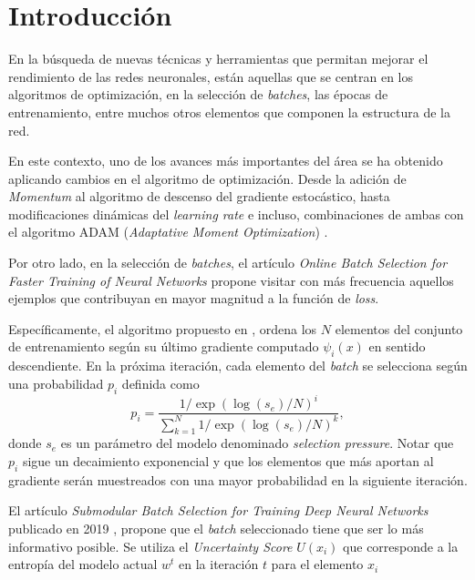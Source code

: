 \section{Introducción}

En la búsqueda de nuevas técnicas y herramientas que permitan mejorar el rendimiento de las redes neuronales, están aquellas que se centran en los algoritmos de optimización, en la selección de \textit{batches}, las épocas de entrenamiento, entre muchos otros elementos que componen la estructura de la red. 

\vspace{0.2cm}

En este contexto, uno de los avances más importantes del área se ha obtenido aplicando cambios en el algoritmo de optimización. Desde la adición de \textit{Momentum} al algoritmo de descenso del gradiente estocástico, hasta modificaciones dinámicas del \textit{learning rate} e incluso, combinaciones de ambas con el algoritmo ADAM (\textit{Adaptative Moment Optimization}) \cite{https://doi.org/10.48550/arxiv.1412.6980}.

\vspace{0.2cm}

Por otro lado, en la selección de \textit{batches}, el artículo \textit{Online Batch Selection for Faster Training of Neural Networks} \cite{https://doi.org/10.48550/arxiv.1511.06343} propone visitar con más frecuencia aquellos ejemplos que contribuyan en mayor magnitud a la función de \textit{loss}.
 
\vspace{0.2cm}

Específicamente, el algoritmo propuesto en \cite{https://doi.org/10.48550/arxiv.1511.06343}, ordena los $N$ elementos del conjunto de entrenamiento según su último gradiente computado $\psi_i(x)$ en sentido descendiente. En la próxima iteración, cada elemento del \textit{batch} se selecciona según una probabilidad $p_i$ definida como 
\[
p_i = \frac{1/\exp(\log(s_e)/N)^{i}}{\sum_{k=1}^N 1/\exp(\log(s_e)/N)^{k}} ,
\] donde $s_e$ es un parámetro del modelo denominado \textit{selection pressure}. Notar que $p_i$ sigue un decaimiento exponencial y que los elementos que más aportan al gradiente serán muestreados con una mayor probabilidad en la siguiente iteración. 

\vspace{0.2cm}

El artículo \textit{Submodular Batch Selection for Training Deep Neural Networks} publicado en 2019 \cite{ijcai2019p372}, propone que el \textit{batch} seleccionado tiene que ser lo más informativo posible. Se utiliza el \textit{Uncertainty Score} $U(x_i)$ que corresponde a la entropía del modelo actual $w^t$ en la iteración $t$ para el elemento $x_i$

